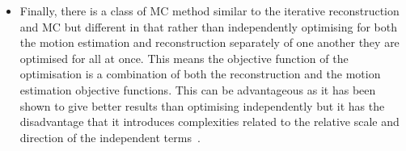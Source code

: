 \begin{itemize}
                \item Finally, there is a class of \gls{MC} method similar to the iterative reconstruction and \gls{MC} but different in that rather than independently optimising for both the motion estimation and reconstruction separately of one another they are optimised for all at once. This means the objective function of the optimisation is a combination of both the reconstruction and the motion estimation objective functions. This can be advantageous as it has been shown to give better results than optimising independently but it has the disadvantage that it introduces complexities related to the relative scale and direction of the independent terms~.
            \end{itemize}
    
        
        
            
            
                            
                            
                
                            
                            
                
